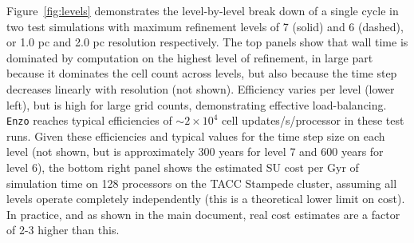 \documentclass[11pt]{article}
\begin{document}
Figure~\ref{fig:levels} demonstrates the level-by-level break down of a single cycle in two test simulations with maximum refinement levels of 7 (solid) and 6 (dashed), or 1.0 pc and 2.0 pc resolution respectively. The top panels show that wall time is dominated by computation on the highest level of refinement, in large part because it dominates the cell count across levels, but also because the time step decreases linearly with resolution (not shown). Efficiency varies per level (lower left), but is high for large grid counts, demonstrating effective load-balancing. \texttt{Enzo} reaches typical efficiencies of $\sim 2 \times 10^{4}$ cell updates/s/processor in these test runs. Given these efficiencies and typical values for the time step size on each level (not shown, but is approximately 300 years for level 7 and 600 years for level 6), the bottom right panel shows the estimated SU cost per Gyr of simulation time on 128 processors on the TACC Stampede cluster, assuming all levels operate completely independently (this is a theoretical lower limit on cost). In practice, and as shown in the main document, real cost estimates are a factor of 2-3 higher than this.

\end{document}
